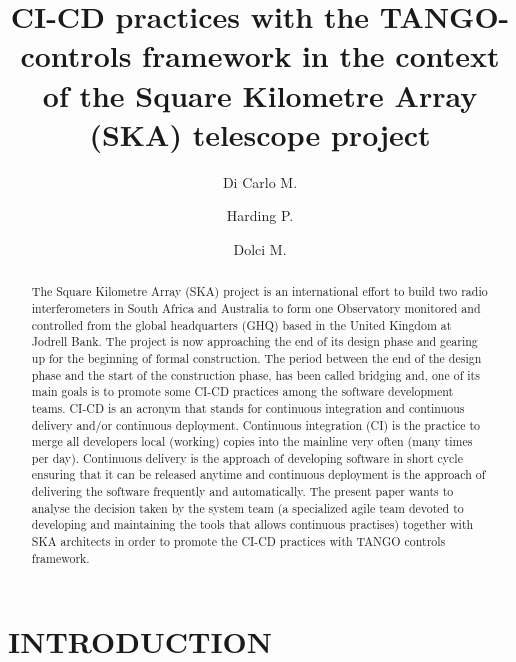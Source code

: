 \documentclass[a4paper]{spie}  %
\title{CI-CD practices with the TANGO-controls framework in the context of the Square Kilometre Array (SKA) telescope project}
\author[a]{Di Carlo M.}
\author[b]{Harding P.}
\author[a]{Dolci M.}
\affil[a]{INAF Osservatorio Astronomico d'Abruzzo, Teramo, Italy}
\affil[b]{SKA Organisation, Macclesfield, UK}
\begin{document}
 
\maketitle

\begin{abstract}
The Square Kilometre Array (SKA) project is an international effort to build two radio interferometers in South Africa and Australia to form one Observatory monitored and controlled from the global headquarters (GHQ) based in the United Kingdom at Jodrell Bank. The project is now approaching the end of its design phase and gearing up for the beginning of formal construction. The period between the end of the design phase and the start of the construction phase, has been called bridging and, one of its main goals is to promote some CI-CD practices among the software development teams. CI-CD is an acronym that stands for continuous integration and continuous delivery and/or continuous deployment. Continuous integration (CI) is the practice to merge all developers local (working) copies into the mainline very often (many times per day). Continuous delivery is the approach of developing software in short cycle ensuring that it can be released anytime and continuous deployment is the approach of delivering the software frequently and automatically. The present paper wants to analyse the decision taken by the system team (a specialized agile team devoted to developing and maintaining the tools that allows continuous practises) together with SKA architects in order to promote the CI-CD practices with TANGO controls framework. 
\end{abstract}


\section{INTRODUCTION}
\label{sec:intro}  %
\end{document}
